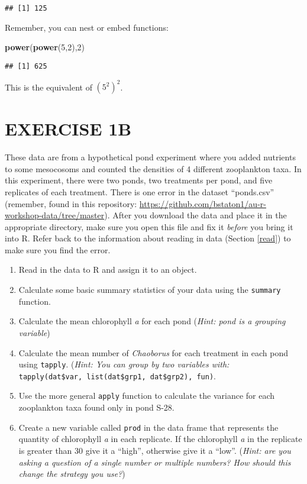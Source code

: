 \documentclass[]{book}
\newenvironment{Shaded}{\begin{snugshade}}{\end{snugshade}}
\newcommand{\KeywordTok}[1]{\textcolor[rgb]{0.13,0.29,0.53}{\textbf{#1}}}
\newcommand{\DecValTok}[1]{\textcolor[rgb]{0.00,0.00,0.81}{#1}}
\newcommand{\NormalTok}[1]{#1}
\theoremstyle{definition}
\theoremstyle{definition}
\theoremstyle{definition}
\theoremstyle{remark}
\begin{document}
\begin{verbatim}
## [1] 125
\end{verbatim}

Remember, you can nest or embed functions:

\begin{Shaded}
\begin{Highlighting}[]
\KeywordTok{power}\NormalTok{(}\KeywordTok{power}\NormalTok{(}\DecValTok{5}\NormalTok{,}\DecValTok{2}\NormalTok{),}\DecValTok{2}\NormalTok{)}
\end{Highlighting}
\end{Shaded}

\begin{verbatim}
## [1] 625
\end{verbatim}

This is the equivalent of \((5^2)^2\).

\section*{EXERCISE 1B}\label{exercise-1b}

These data are from a hypothetical pond experiment where you added
nutrients to some mesocosoms and counted the densities of 4 different
zooplankton taxa. In this experiment, there were two ponds, two
treatments per pond, and five replicates of each treatment. There is one
error in the dataset ``ponds.csv'' (remember, found in this repository:
\url{https://github.com/bstaton1/au-r-workshop-data/tree/master}). After
you download the data and place it in the appropriate directory, make
sure you open this file and fix it \emph{before} you bring it into R.
Refer back to the information about reading in data (Section \ref{read})
to make sure you find the error.

\begin{enumerate}
\def\labelenumi{\arabic{enumi}.}
\item
  Read in the data to R and assign it to an object.
\item
  Calculate some basic summary statistics of your data using the
  \texttt{summary} function.
\item
  Calculate the mean chlorophyll \emph{a} for each pond (\emph{Hint:
  pond is a grouping variable})
\item
  Calculate the mean number of \emph{Chaoborus} for each treatment in
  each pond using \texttt{tapply}. (\emph{Hint: You can group by two
  variables with:}
  \texttt{tapply(dat\$var,\ list(dat\$grp1,\ dat\$grp2),\ fun)}.
\item
  Use the more general \texttt{apply} function to calculate the variance
  for each zooplankton taxa found only in pond S-28.
\item
  Create a new variable called \texttt{prod} in the data frame that
  represents the quantity of chlorophyll \emph{a} in each replicate. If
  the chlorophyll \emph{a} in the replicate is greater than 30 give it a
  ``high'', otherwise give it a ``low''. (\emph{Hint: are you asking a
  question of a single number or multiple numbers? How should this
  change the strategy you use?})
\end{enumerate}
\end{document}
